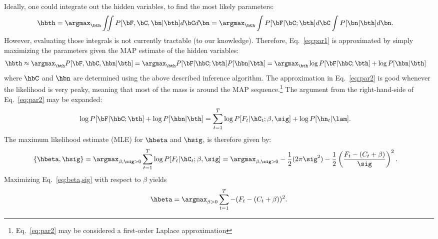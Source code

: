 Ideally, one could integrate out the hidden variables, to find the most likely parameters:
\begin{align} \label{eq:par1}
\hbth &= \argmax_{\bth} \iint P[\bF, \bC, \bn | \bth] d\bC d\bn = \argmax_{\bth} \int P[\bF | \bC; \bth] d\bC \int P[\bn | \bth] d\bn.
\end{align}
However, evaluating those integrals is not currently tractable (to our knowledge).
Therefore, Eq.~\eqref{eq:par1} is approximated by simply maximizing the parameters given the MAP estimate of the hidden variables:
\begin{align} \label{eq:par2}
\hbth &\approx \argmax_{\bth} P[\bF, \hbC, \hbn | \bth] = \argmax_{\bth} P[\bF| \hbC; \bth] P[\hbn | \bth] = \argmax_{\bth} \log P[\bF | \hbC; \bth] + \log P[\hbn | \bth] 
\end{align}
\noindent where $\hbC$ and $\hbn$ are determined using the above described inference algorithm. The approximation in Eq.~\eqref{eq:par2} is good whenever the likelihood is very peaky, meaning that most of the mass is around the MAP sequence.\footnote{Eq.~\eqref{eq:par2} may be considered a first-order Laplace approximation}   The argument from the right-hand-side of Eq.~\eqref{eq:par2} may be expanded: 
\begin{align} \label{eq:par3}
\log P[\bF| \hbC; \bth] + \log P[\hbn | \bth] &= \sum_{t=1}^T \log P[F_t | \hC_t; \beta,\sig] + \log P[\hn_t | \lam].
\end{align}
\noindent The maximum likelihood estimate (MLE) for $\hbeta$ and $\hsig$, is therefore given by:
\begin{align} \label{eq:beta,sig}
	\{\hbeta,\hsig\} &=  \argmax_{\beta,\sig >0} \sum_{t=1}^T \log P[F_t | \hC_t; \beta,\sig]
	=  \argmax_{\beta,\sig >0} 	-\frac{1}{2} (2\pi \sig^2) - \frac{1}{2} \left(\frac{F_t-(C_t+\beta)}{\sig}\right)^2. %
\end{align}
Maximizing Eq.~\eqref{eq:beta,sig} with respect to $\beta$ yields
\begin{align}
\hbeta = \argmax_{\beta>0} \sum_{t=1}^T -(F_t - (C_t + \beta))^2.
\end{align}

